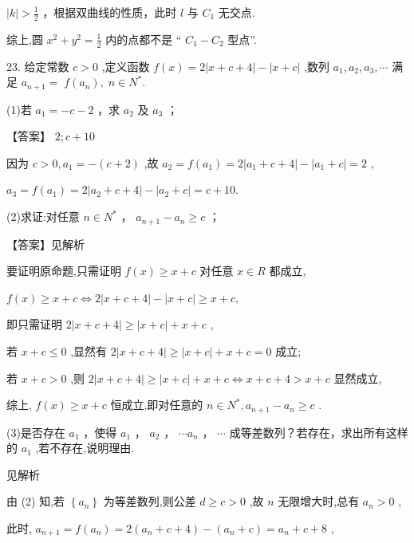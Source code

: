 \documentclass[10pt]{article}
\newcommand*\circled[1]{\tikz[baseline=(char.base)]{\node[shape=circle,draw,inner sep=1.5pt] (char) {\small #1};}}
\begin{document}
 \circled{2}  \(\left| k\right|  > \frac{1}{2}\) ，根据双曲线的性质，此时 \(l\) 与 \({C}_{1}\) 无交点.

综上,圆 \({x}^{2} + {y}^{2} = \frac{1}{2}\) 内的点都不是 “ \({C}_{1} - {C}_{2}\) 型点”.

23. 给定常数 \(c > 0\) ,定义函数 \(f\left( x\right)  = 2\left| {x + c + 4}\right|  - \left| {x + c}\right|\) ,数列 \({a}_{1},{a}_{2},{a}_{3},\cdots\) 满足 \({a}_{n + 1} = \; f\left( {a}_{n}\right) ,\;n \in  {N}^{ * }.\)

(1)若 \({a}_{1} =  - c - 2\) ，求 \({a}_{2}\) 及 \({a}_{3}\) ；

【答案】 \(2;c + {10}\)

因为 \(c > 0,{a}_{1} =  - \left( {c + 2}\right)\) ,故 \({a}_{2} = f\left( {a}_{1}\right)  = 2\left| {{a}_{1} + c + 4}\right|  - \left| {{a}_{1} + c}\right|  = 2\) ,

\({a}_{3} = f\left( {a}_{1}\right)  = 2\left| {{a}_{2} + c + 4}\right|  - \left| {{a}_{2} + c}\right|  = c + {10}.\)

(2)求证:对任意 \(n \in  {N}^{ * }\) ， \({a}_{n + 1} - {a}_{n} \geq  c\) ；

【答案】见解析

要证明原命题,只需证明 \(f\left( x\right)  \geq  x + c\) 对任意 \(x \in  R\) 都成立,

\(f\left( x\right)  \geq  x + c \Leftrightarrow  2\left| {x + c + 4}\right|  - \left| {x + c}\right|  \geq  x + c,\)

即只需证明 \(2\left| {x + c + 4}\right|  \geq  \left| {x + c}\right|  + x + c\) ,

若 \(x + c \leq  0\) ,显然有 \(2\left| {x + c + 4}\right|  \geq  \left| {x + c}\right|  + x + c = 0\) 成立;

若 \(x + c > 0\) ,则 \(2\left| {x + c + 4}\right|  \geq  \left| {x + c}\right|  + x + c \Leftrightarrow  x + c + 4 > x + c\) 显然成立,

综上, \(f\left( x\right)  \geq  x + c\) 恒成立,即对任意的 \(n \in  {N}^{ * },{a}_{n + 1} - {a}_{n} \geq  c\) .

(3)是否存在 \({a}_{1}\) ，使得 \({a}_{1}\) ， \({a}_{2}\) ， \(\cdots {a}_{n}\) ， \(\cdots\) 成等差数列？若存在，求出所有这样的 \({a}_{1}\) ,若不存在,说明理由.

见解析

由 (2) 知,若 \(\left\{  {a}_{n}\right\}\) 为等差数列,则公差 \(d \geq  c > 0\) ,故 \(n\) 无限增大时,总有 \({a}_{n} > 0\) ,

此时, \({a}_{n + 1} = f\left( {a}_{n}\right)  = 2\left( {{a}_{n} + c + 4}\right)  - \left( {{a}_{n} + c}\right)  = {a}_{n} + c + 8\) ,
\end{document}
